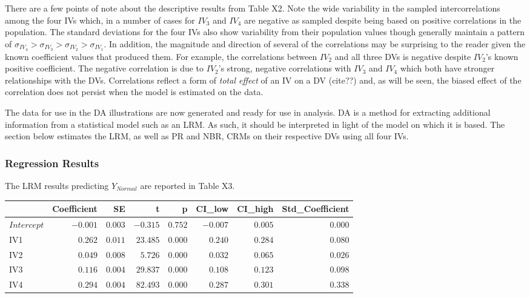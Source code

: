 \documentclass[ShortAfour,times,sageapa]{sagej}
\begin{document}
	There are a few points of note about the descriptive results from Table X2.  
	Note the wide variability in the sampled intercorrelations among the four IVs which, in a number of cases for $IV_3$ and $IV_4$ are negative as sampled despite being based on positive correlations in the population.  
	The standard deviations for the four IVs also show variability from their population values though generally maintain a pattern of $\sigma_{IV_4} > \sigma_{IV_3} > \sigma_{IV_2} > \sigma_{IV_1}$.
	In addition, the magnitude and direction of several of the correlations may be surprising to the reader given the known coefficient values that produced them.  
	For example, the correlations between $IV_2$ and all three DVs is negative despite $IV_2$'s known positive coefficient.
	The negative correlation is due to $IV_2$'s strong, negative correlations with $IV_3$ and $IV_4$ which both have stronger relationships with the DVs.
	Correlations reflect a form of \emph{total effect} of an IV on a DV (cite??) and, as will be seen, the biased effect of the correlation does not persist when the model is estimated on the data.
	
	The data for use in the DA illustrations are now generated and ready for use in analysis.
	DA is a method for extracting additional information from a statistical model such as an LRM.
	As such, it should be interpreted in light of the model on which it is based.
	The section below estimates the LRM, as well as PR and NBR, CRMs on their respective DVs using all four IVs.

		\subsubsection{Regression Results}
		
	The LRM results predicting $Y_{Normal}$ are reported in Table X3.
	
	\begin{longtable}{l|rrrrrrr}
		\toprule
		\multicolumn{1}{l}{} & Coefficient & SE & t & p & CI\_low & CI\_high & Std\_Coefficient \\ 
		\midrule
		\(Intercept\) & $-0.001$ & $0.003$ & $-0.315$ & $0.752$ & $-0.007$ & $0.005$ & $0.000$ \\ 
		IV1 & $0.262$ & $0.011$ & $23.485$ & $0.000$ & $0.240$ & $0.284$ & $0.080$ \\ 
		IV2 & $0.049$ & $0.008$ & $5.726$ & $0.000$ & $0.032$ & $0.065$ & $0.026$ \\ 
		IV3 & $0.116$ & $0.004$ & $29.837$ & $0.000$ & $0.108$ & $0.123$ & $0.098$ \\ 
		IV4 & $0.294$ & $0.004$ & $82.493$ & $0.000$ & $0.287$ & $0.301$ & $0.338$ \\ 
		\bottomrule
	\end{longtable}
	
\end{document}
